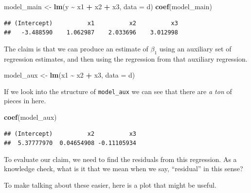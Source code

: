 \documentclass[
]{book}
\newenvironment{Shaded}{\begin{snugshade}}{\end{snugshade}}
\newcommand{\AttributeTok}[1]{\textcolor[rgb]{0.13,0.29,0.53}{#1}}
\newcommand{\FunctionTok}[1]{\textcolor[rgb]{0.13,0.29,0.53}{\textbf{#1}}}
\newcommand{\NormalTok}[1]{#1}
\newcommand{\OtherTok}[1]{\textcolor[rgb]{0.56,0.35,0.01}{#1}}
\newcommand{\SpecialCharTok}[1]{\textcolor[rgb]{0.81,0.36,0.00}{\textbf{#1}}}
\theoremstyle{definition}
\theoremstyle{definition}
\theoremstyle{definition}
\theoremstyle{definition}
\theoremstyle{remark}
\begin{document}
\begin{Shaded}
\begin{Highlighting}[]
\NormalTok{model\_main }\OtherTok{\textless{}{-}} \FunctionTok{lm}\NormalTok{(y }\SpecialCharTok{\textasciitilde{}}\NormalTok{ x1 }\SpecialCharTok{+}\NormalTok{ x2 }\SpecialCharTok{+}\NormalTok{ x3, }\AttributeTok{data =}\NormalTok{ d)}
\FunctionTok{coef}\NormalTok{(model\_main)}
\end{Highlighting}
\end{Shaded}

\begin{verbatim}
## (Intercept)          x1          x2          x3 
##   -3.488590    1.062987    2.033696    3.012998
\end{verbatim}

The claim is that we can produce an estimate of \(\beta_1\) using an auxiliary set of regression estimates, and then using the regression from that auxiliary regression.

\begin{Shaded}
\begin{Highlighting}[]
\NormalTok{model\_aux }\OtherTok{\textless{}{-}} \FunctionTok{lm}\NormalTok{(x1 }\SpecialCharTok{\textasciitilde{}}\NormalTok{ x2 }\SpecialCharTok{+}\NormalTok{ x3, }\AttributeTok{data =}\NormalTok{ d)}
\end{Highlighting}
\end{Shaded}

If we look into the structure of \texttt{model\_aux} we can see that there are \emph{a ton} of pieces in here.

\begin{Shaded}
\begin{Highlighting}[]
\FunctionTok{coef}\NormalTok{(model\_aux)}
\end{Highlighting}
\end{Shaded}

\begin{verbatim}
## (Intercept)          x2          x3 
##  5.37777970  0.04654908 -0.11105934
\end{verbatim}

To evaluate our claim, we need to find the residuals from this regression. As a knowledge check, what is it that we mean when we say, ``residual'' in this sense?

To make talking about these easier, here is a plot that might be useful.
\end{document}

